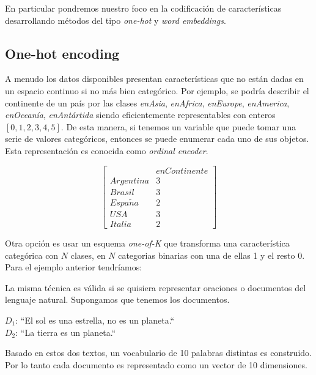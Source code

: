 En particular pondremos nuestro foco en la codificación de características
desarrollando métodos del tipo \emph{one-hot} y \emph{word embeddings}.

\subsection{One-hot encoding}
\label{method:ohe}

A menudo los datos disponibles presentan características que no están dadas en
un espacio continuo si no más bien categórico. Por ejemplo, se podría describir
el continente de un país por las clases \emph{enAsia}, \emph{enAfrica},
\emph{enEurope}, \emph{enAmerica}, \emph{enOceanía}, \emph{enAntártida} siendo
eficientemente representables con enteros $[0, 1, 2, 3, 4, 5]$. De esta manera,
si tenemos un variable que puede tomar una serie de valores categóricos,
entonces se puede enumerar cada uno de sus objetos. Esta representación es
conocida como \emph{ordinal encoder}.

\begin{equation*}
    \begin{bmatrix}
         & enContinente\\
        Argentina & 3 \\
        Brasil & 3 \\
        Espa\tilde{n}a & 2 \\
        USA & 3  \\
        Italia & 2 
    \end{bmatrix}
\end{equation*}

Otra opción es usar un esquema \emph{one-of-K} que transforma una característica
categórica con $N$ clases, en $N$ categorias binarias con una de ellas 1 y el
resto 0. Para el ejemplo anterior tendríamos:

La misma técnica es válida si se quisiera representar oraciones o documentos del
lenguaje natural. Supongamos que tenemos los documentos.

\begin{center}
    $D_1$: ``El sol es una estrella, no es un planeta.`` \\
    $D_2$: ``La tierra es un planeta.``    
\end{center}

Basado en  estos dos textos, un vocabulario de 10 palabras distintas es
construido. Por lo tanto cada documento es representado como un vector de 10
dimensiones.

\begin{table}[H]
    \centering
\end{table}

